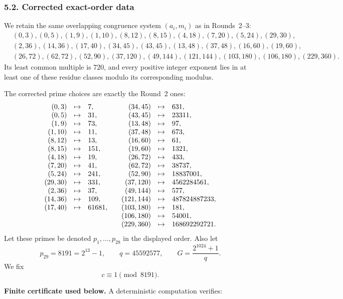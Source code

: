 \subsubsection*{5.2. Corrected exact-order data}

We retain the same overlapping congruence system $(a_i,m_i)$ as in Rounds~2--3:
\[
\begin{aligned}
&(0,3),(0,5),(1,9),(1,10),(8,12),(8,15),(4,18),(7,20),(5,24),(29,30),\\
&(2,36),(14,36),(17,40),(34,45),(43,45),(13,48),(37,48),(16,60),(19,60),\\
&(26,72),(62,72),(52,90),(37,120),(49,144),(121,144),(103,180),(106,180),(229,360).
\end{aligned}
\]
Its least common multiple is $720$, and every positive integer exponent lies in at least one of these residue classes modulo its corresponding modulus.

The corrected prime choices are exactly the Round~2 ones:
\[
\begin{array}{rcl@{\qquad}rcl}
(0,3)&\mapsto&7,&(34,45)&\mapsto&631,\\
(0,5)&\mapsto&31,&(43,45)&\mapsto&23311,\\
(1,9)&\mapsto&73,&(13,48)&\mapsto&97,\\
(1,10)&\mapsto&11,&(37,48)&\mapsto&673,\\
(8,12)&\mapsto&13,&(16,60)&\mapsto&61,\\
(8,15)&\mapsto&151,&(19,60)&\mapsto&1321,\\
(4,18)&\mapsto&19,&(26,72)&\mapsto&433,\\
(7,20)&\mapsto&41,&(62,72)&\mapsto&38737,\\
(5,24)&\mapsto&241,&(52,90)&\mapsto&18837001,\\
(29,30)&\mapsto&331,&(37,120)&\mapsto&4562284561,\\
(2,36)&\mapsto&37,&(49,144)&\mapsto&577,\\
(14,36)&\mapsto&109,&(121,144)&\mapsto&487824887233,\\
(17,40)&\mapsto&61681,&(103,180)&\mapsto&181,\\
&&&(106,180)&\mapsto&54001,\\
&&&(229,360)&\mapsto&168692292721.
\end{array}
\]
Let these primes be denoted $p_1,\dots,p_{28}$ in the displayed order.  Also let
\[
p_{29}=8191=2^{13}-1,\qquad q=45592577,\qquad G=\frac{2^{1024}+1}{q}.
\]
We fix
\[
c\equiv 1\pmod{8191}.
\]

\medskip
\noindent\textbf{Finite certificate used below.}
A deterministic computation verifies:

